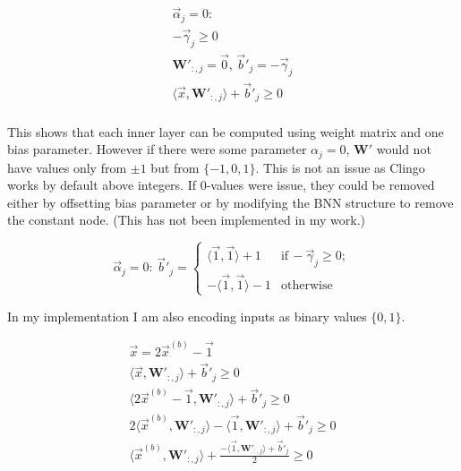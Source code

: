 \documentclass{fithesis}
\newcommand{\mat}[1]{\mathbf{#1}}
\begin{document}
\begin{equation*}
    \begin{matrix}
        \vec\alpha_j = 0: \\
        - \vec\gamma_j \geq 0\\
        \mat W'_{:, j} = \vec 0, \,
        \vec b'_j = - \vec\gamma_j\\
        \langle \vec x, \mat W'_{:, j}\rangle + \vec b'_j \geq 0\\
    \end{matrix}
\end{equation*}

This shows that each inner layer can be computed using weight matrix and
one bias parameter. However if there were some parameter $\alpha_j = 0$,
$\mat W'$ would not have values only from $\pm 1$ but from $\{-1, 0, 1\}$.
This is not an issue as Clingo works by default above integers.
If 0-values were issue, they could be removed either by offsetting bias
parameter or by modifying the BNN structure to remove the constant node.
(This has not been implemented in my work.)

\begin{equation*}
    \vec \alpha_j = 0:\, \vec b'_j = \left\{
        \begin{matrix}
            \langle\vec 1, \vec 1\rangle + 1 & \mathrm{if}\,-\vec\gamma_j \geq 0;\\
            -\langle\vec 1, \vec 1\rangle - 1 & \mathrm{otherwise}
        \end{matrix}
    \right.
\end{equation*}

In my implementation I am also encoding inputs as binary values $\{0, 1\}$.

\begin{equation*}
    \begin{matrix}
        \vec x = 2 \vec x^{(b)} - \vec1\\
        \langle \vec x, \mat W'_{:, j}\rangle + \vec b'_j \geq 0\\
        \langle 2\vec x^{(b)} - \vec1, \mat W'_{:, j}\rangle + \vec b'_j \geq 0\\
        2\langle \vec x^{(b)}, \mat W'_{:, j}\rangle - \langle\vec1, \mat W'_{:,j}\rangle + \vec b'_j \geq 0\\
        \langle \vec x^{(b)}, \mat W'_{:, j}\rangle + \frac{- \langle\vec1, \mat W'_{:,j}\rangle + \vec b'_j}{2} \geq 0\\
    \end{matrix}
\end{equation*}
\end{document}
